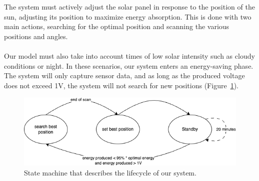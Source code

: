 The system must actively adjust the solar panel in response to the position of
the sun, adjusting its position to maximize energy absorption. This is done with
two main actions, searching for the optimal position and scanning the various
positions and angles. \\ \\
Our model must also take into account times of low solar intensity such as
cloudy conditions or night. In these scenarios, our system enters an
energy-saving phase. The system will only capture sensor data, and as long as
the produced voltage does not exceed 1V, the system will not search for new
positions (Figure~\ref{fig:seros-sm}).
\begin{figure}[h]
    \centering
    \includegraphics[width=12cm]{../assets/png/servos-state-machine}
    \caption{State machine that describes the lifecycle of our system.}
    \label{fig:seros-sm}
\end{figure}
